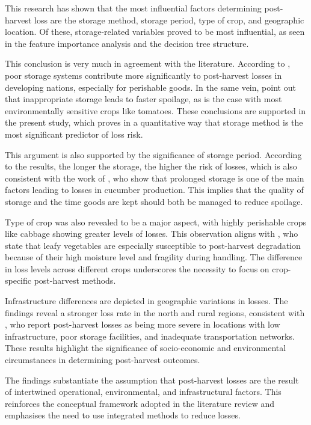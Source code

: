 This research has shown that the most influential factors determining post-harvest loss are the
storage method, storage period, type of crop, and geographic location. Of these, storage-related
variables proved to be most influential, as seen in the feature importance analysis and the decision
tree structure.

This conclusion is very much in agreement with the literature. According to
\cite{rajapaksha2021reducing}, poor storage systems contribute more significantly to post-harvest
losses in developing nations, especially for perishable goods. In the same vein,
\cite{wakene2024comprehensive} point out that inappropriate storage leads to faster spoilage, as is
the case with most environmentally sensitive crops like tomatoes. These conclusions are supported in
the present study, which proves in a quantitative way that storage method is the most significant
predictor of loss risk.

This argument is also supported by the significance of storage period. According to the results,
the longer the storage, the higher the risk of losses, which is also consistent with the work of
\cite{ukwuaba2024mitigating}, who show that prolonged storage is one of the main factors leading to
losses in cucumber production. This implies that the quality of storage and the time goods are kept
should both be managed to reduce spoilage.

Type of crop was also revealed to be a major aspect, with highly perishable crops like cabbage
showing greater levels of losses. This observation aligns with \cite{oluoch2024causes}, who state
that leafy vegetables are especially susceptible to post-harvest degradation because of their high
moisture level and fragility during handling. The difference in loss levels across different crops
underscores the necessity to focus on crop-specific post-harvest methods.

Infrastructure differences are depicted in geographic variations in losses. The findings reveal a
stronger loss rate in the north and rural regions, consistent with \cite{pluato2024impact}, who
report post-harvest losses as being more severe in locations with low infrastructure, poor storage
facilities, and inadequate transportation networks. These results highlight the significance of
socio-economic and environmental circumstances in determining post-harvest outcomes.

The findings substantiate the assumption that post-harvest losses are the result of intertwined
operational, environmental, and infrastructural factors. This reinforces the conceptual framework
adopted in the literature review and emphasises the need to use integrated methods to reduce losses.

